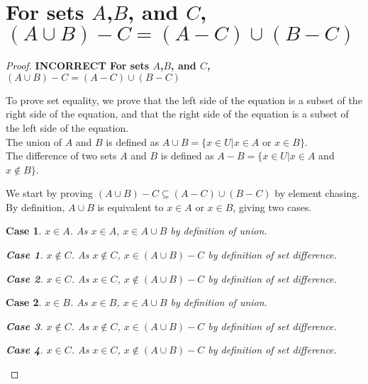 \documentclass[12pt]{article}
\newtheorem{case}{Case}
\newtheorem{subcase}{Case}
\numberwithin{subcase}{case}
\begin{document}
\section*{For sets $A$,$B$, and $C$,$(A\cup B) - C = (A - C) \cup (B - C)$}
\begin{proof} 
\bf{INCORRECT}
For sets $A$,$B$, and $C$,$(A\cup B) - C = (A - C) \cup (B - C)$

To prove set equality, we prove that the left side of the equation is a subset of the right side of the
equation, and that the right side of the equation is a subset of the left side of the equation.\\
The union of $A$ and $B$ is defined as $A \cup B = \{ x \in U | x \in A$ or $x \in B\}$.\\
The difference of two sets $A$ and $B$ is defined as $A - B = \{x \in U | x \in A$ and $x \not\in B\}$.

We start by proving $(A\cup B) - C \subseteq (A - C) \cup (B - C)$ by element chasing.
By definition, $A \cup B$ is equivalent to $x \in A$ or $x \in B$, giving two cases.
\begin{case}
$x \in A$. As $x \in A$, $x \in A \cup B$ by definition of union.
  \begin{subcase}
    $x \not\in C$. As $x \not\in C$, $x \in (A\cup B) - C$ by definition of set difference.
  \end{subcase}
  \begin{subcase}
    $x \in C$. As $x \in C$, $x \not\in (A \cup B) - C$ by definition of set difference.
  \end{subcase}
\end{case}
\begin{case}
  $x \in B$. As $x \in B$, $x \in A \cup B$ by definition of union.
  \begin{subcase}
    $x \not\in C$. As $x \not\in C$, $x \in (A\cup B) - C$ by definition of set difference.
  \end{subcase}
  \begin{subcase}
    $x \in C$. As $x \in C$, $x \not\in (A \cup B) - C$ by definition of set difference.
  \end{subcase}
\end{case}


\end{proof}
\end{document}
